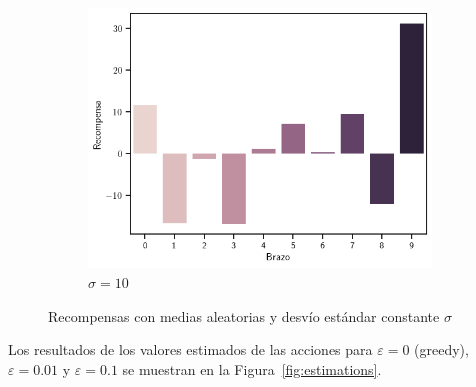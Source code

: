 \documentclass[12pt]{article}
\begin{document}
\begin{figure}[h]
\begin{subfigure}[H]{0.45\textwidth}
            \includegraphics[width=\textwidth]{../img/rewards_sigma_10}
            \caption{$\sigma=10$}
            \label{fig:rewards_10}
        \end{subfigure}
        \caption{Recompensas con medias aleatorias y desvío estándar constante $\sigma$}
        \label{fig:rewards}
    \end{figure}

    \lipsum[1]

    Los resultados de los valores estimados de las acciones para $\varepsilon=0$ (greedy), $\varepsilon=0.01$ y $\varepsilon=0.1$ se muestran en la Figura~\ref{fig:estimations}.
\end{document}
